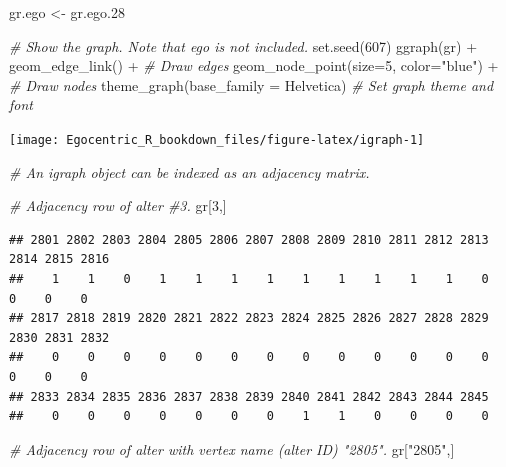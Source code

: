 \documentclass[
]{book}
\newenvironment{Shaded}{\begin{snugshade}}{\end{snugshade}}
\newcommand{\AttributeTok}[1]{\textcolor[rgb]{0.77,0.63,0.00}{#1}}
\newcommand{\CommentTok}[1]{\textcolor[rgb]{0.56,0.35,0.01}{\textit{#1}}}
\newcommand{\DecValTok}[1]{\textcolor[rgb]{0.00,0.00,0.81}{#1}}
\newcommand{\FloatTok}[1]{\textcolor[rgb]{0.00,0.00,0.81}{#1}}
\newcommand{\FunctionTok}[1]{\textcolor[rgb]{0.00,0.00,0.00}{#1}}
\newcommand{\NormalTok}[1]{#1}
\newcommand{\OtherTok}[1]{\textcolor[rgb]{0.56,0.35,0.01}{#1}}
\newcommand{\SpecialCharTok}[1]{\textcolor[rgb]{0.00,0.00,0.00}{#1}}
\newcommand{\StringTok}[1]{\textcolor[rgb]{0.31,0.60,0.02}{#1}}
\begin{document}
\begin{Shaded}
\begin{Highlighting}[]
\NormalTok{gr.ego }\OtherTok{\textless{}{-}}\NormalTok{ gr.ego}\FloatTok{.28}

\CommentTok{\# Show the graph. Note that ego is not included.}
\FunctionTok{set.seed}\NormalTok{(}\DecValTok{607}\NormalTok{)}
\FunctionTok{ggraph}\NormalTok{(gr) }\SpecialCharTok{+} 
  \FunctionTok{geom\_edge\_link}\NormalTok{() }\SpecialCharTok{+} \CommentTok{\# Draw edges}
  \FunctionTok{geom\_node\_point}\NormalTok{(}\AttributeTok{size=}\DecValTok{5}\NormalTok{, }\AttributeTok{color=}\StringTok{"blue"}\NormalTok{) }\SpecialCharTok{+} \CommentTok{\# Draw nodes}
  \FunctionTok{theme\_graph}\NormalTok{(}\AttributeTok{base\_family =} \StringTok{\textquotesingle{}Helvetica\textquotesingle{}}\NormalTok{) }\CommentTok{\# Set graph theme and font}
\end{Highlighting}
\end{Shaded}

\begin{center}\texttt{[image: Egocentric\_R\_bookdown\_files/figure-latex/igraph-1]} \end{center}

\begin{Shaded}
\begin{Highlighting}[]
\CommentTok{\# An igraph object can be indexed as an adjacency matrix.}

\CommentTok{\# Adjacency row of alter \#3.}
\NormalTok{gr[}\DecValTok{3}\NormalTok{,]}
\end{Highlighting}
\end{Shaded}

\begin{verbatim}
## 2801 2802 2803 2804 2805 2806 2807 2808 2809 2810 2811 2812 2813 2814 2815 2816 
##    1    1    0    1    1    1    1    1    1    1    1    1    0    0    0    0 
## 2817 2818 2819 2820 2821 2822 2823 2824 2825 2826 2827 2828 2829 2830 2831 2832 
##    0    0    0    0    0    0    0    0    0    0    0    0    0    0    0    0 
## 2833 2834 2835 2836 2837 2838 2839 2840 2841 2842 2843 2844 2845 
##    0    0    0    0    0    0    0    1    1    0    0    0    0
\end{verbatim}

\begin{Shaded}
\begin{Highlighting}[]
\CommentTok{\# Adjacency row of alter with vertex name (alter ID) "2805".}
\NormalTok{gr[}\StringTok{"2805"}\NormalTok{,]}
\end{Highlighting}
\end{Shaded}
\end{document}
